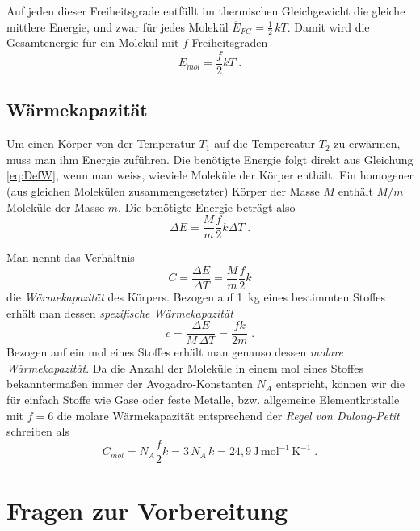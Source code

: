Auf jeden dieser Freiheitsgrade entfällt im thermischen Gleichgewicht die gleiche mittlere Energie, und zwar für jedes Molekül $\overline{E}_{FG}= \frac{1}{2}\, kT$. Damit wird die Gesamtenergie für ein Molekül mit $f$ Freiheitsgraden
\begin{equation} \label{eq:DefW}
 \overline{E}_{mol} = \frac{f}{2}kT\; .
\end{equation}

\subsection{Wärmekapazität}

Um einen Körper von der Temperatur $T_1$ auf die Tempereatur $T_2$ zu erwärmen, muss man ihm Energie zuführen. Die benötigte Energie folgt direkt aus Gleichung \ref{eq:DefW}, wenn man weiss, wieviele Moleküle der Körper enthält. Ein homogener (aus gleichen Molekülen zusammengesetzter) Körper der Masse $M$ enthält $M/m$ Moleküle der Masse $m$. Die benötigte Energie beträgt also
\begin{equation}
 \Delta E = \frac{M}{m}\frac{f}{2}k\Delta T\; .
\end{equation}

Man nennt das Verhältnis 
\begin{equation}
 C = \frac{\Delta E}{\Delta T} = \frac{M}{m}\frac{f}{2}k
\end{equation}
die \textit{Wärmekapazität} des Körpers. Bezogen auf 1~kg eines bestimmten Stoffes erhält man dessen \textit{spezifische Wärmekapazität} 
\begin{equation} \label{eq:spez_Waermekapazitaet}
 c = \frac{\Delta E}{M\,\Delta T} = \frac{fk}{2m}\; .
\end{equation}
Bezogen auf ein mol eines Stoffes erhält man genauso dessen \textit{molare Wärmekapazität}. Da die Anzahl der Moleküle in einem mol eines Stoffes bekanntermaßen immer der Avogadro-Konstanten $N_A$ entspricht, können wir die für einfach Stoffe wie Gase oder feste Metalle, bzw. allgemeine Elementkristalle mit $f=6$ die molare Wärmekapazität entsprechend der \textit{Regel von Dulong-Petit} schreiben als
\begin{equation} \label{eq:Dulong-Petit}
 C_{mol} = N_A\frac{f}{2}k = 3\,N_A\,k = 24,9\,\mathrm{J\,mol^{-1}\,K^{-1}}\; .
\end{equation}

\section{Fragen zur Vorbereitung}

